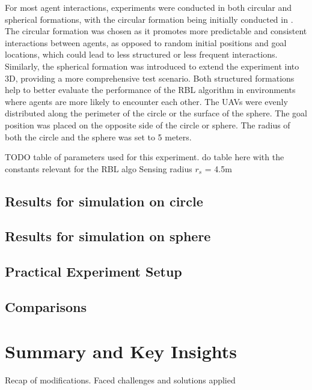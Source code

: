             For most agent interactions, experiments were conducted in both circular and spherical formations, with the circular formation being initially conducted in \cite{rbl_paper}. 
            The circular formation was chosen as it promotes more predictable and consistent interactions between agents, as opposed to random initial positions and goal locations, which could lead to less structured or less frequent interactions. 
            Similarly, the spherical formation was introduced to extend the experiment into 3D, providing a more comprehensive test scenario. 
            Both structured formations help to better evaluate the performance of the RBL algorithm in environments where agents are more likely to encounter each other.
            The UAVs were evenly distributed along the perimeter of the circle or the surface of the sphere. 
            The goal position was placed on the opposite side of the circle or sphere. 
            The radius of both the circle and the sphere was set to 5 meters.
            
            TODO table of parameters used for this experiment.
            do table here with the constants relevant for the RBL algo
            Sensing radius $r_s$ = 4.5m

            \subsection{Results for simulation on circle}
            \subsection{Results for simulation on sphere}

        \subsection{Practical Experiment Setup}
        \subsection{Comparisons}

    \section{Summary and Key Insights}

    Recap of modifications. Faced challenges and solutions applied
